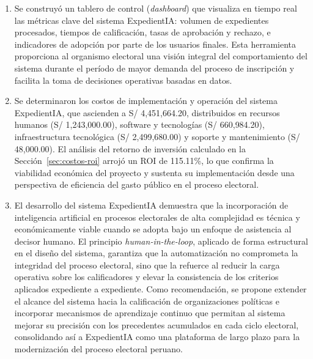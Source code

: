 \documentclass[12pt,a4paper,oneside]{book}
\begin{document}
\begin{enumerate}
    \item Se construyó un tablero de control (\textit{dashboard}) que visualiza en tiempo real las métricas clave del sistema ExpedientIA: volumen de expedientes procesados, tiempos de calificación, tasas de aprobación y rechazo, e indicadores de adopción por parte de los usuarios finales. Esta herramienta proporciona al organismo electoral una visión integral del comportamiento del sistema durante el período de mayor demanda del proceso de inscripción y facilita la toma de decisiones operativas basadas en datos.

    \item Se determinaron los costos de implementación y operación del sistema ExpedientIA, que ascienden a S/ 4{,}451{,}664.20, distribuidos en recursos humanos (S/ 1{,}243{,}000.00), software y tecnologías (S/ 660{,}984.20), infraestructura tecnológica (S/ 2{,}499{,}680.00) y soporte y mantenimiento (S/ 48{,}000.00). El análisis del retorno de inversión calculado en la Sección~\ref{sec:costos-roi} arrojó un ROI de 115.11\%, lo que confirma la viabilidad económica del proyecto y sustenta su implementación desde una perspectiva de eficiencia del gasto público en el proceso electoral.

    \item El desarrollo del sistema ExpedientIA demuestra que la incorporación de inteligencia artificial en procesos electorales de alta complejidad es técnica y económicamente viable cuando se adopta bajo un enfoque de asistencia al decisor humano. El principio \textit{human-in-the-loop}, aplicado de forma estructural en el diseño del sistema, garantiza que la automatización no comprometa la integridad del proceso electoral, sino que la refuerce al reducir la carga operativa sobre los calificadores y elevar la consistencia de los criterios aplicados expediente a expediente. Como recomendación, se propone extender el alcance del sistema hacia la calificación de organizaciones políticas e incorporar mecanismos de aprendizaje continuo que permitan al sistema mejorar su precisión con los precedentes acumulados en cada ciclo electoral, consolidando así a ExpedientIA como una plataforma de largo plazo para la modernización del proceso electoral peruano.

\end{enumerate}

\printbibliography[heading=bibintoc,title={Bibliografía}]
\end{document}
